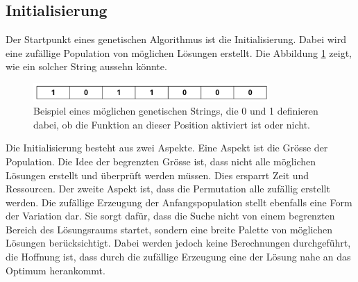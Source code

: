 %
%
%
%
\subsection{Initialisierung
\label{buch:paper:varalg:subsection:initialization}}
Der Startpunkt eines genetischen Algorithmus ist die Initialisierung.
Dabei wird eine zufällige Population von möglichen Lösungen erstellt.
Die Abbildung \ref{fig:possible_genetic_string} zeigt, wie ein solcher 
String aussehn könnte.
\begin{figure}
	\centering
	\includegraphics[width=0.8\textwidth]{
        papers/varalg/images/teil3/01GeneticString.png
        }
	\caption{
		Beispiel eines möglichen genetischen Strings, die 0 und 1 definieren dabei,
		ob die Funktion an dieser Position aktiviert ist oder nicht.
		}
	\label{fig:possible_genetic_string}
\end{figure}
Die Initialisierung besteht aus zwei Aspekte. Eine Aspekt ist die Grösse
der Population. Die Idee der begrenzten Grösse ist, dass nicht alle möglichen
Lösungen erstellt und überprüft werden müssen. Dies ersparrt Zeit und Ressourcen.
Der zweite Aspekt ist, dass die Permutation alle zufällig erstellt werden.
Die zufällige Erzeugung der Anfangspopulation stellt ebenfalls eine Form 
der Variation dar. Sie sorgt dafür, dass die Suche nicht von einem begrenzten 
Bereich des Lösungsraums startet, sondern eine breite Palette von möglichen 
Lösungen berücksichtigt. Dabei werden jedoch keine Berechnungen durchgeführt,
die Hoffnung ist, dass durch die zufällige Erzeugung eine der Lösung nahe
an das Optimum herankommt.

